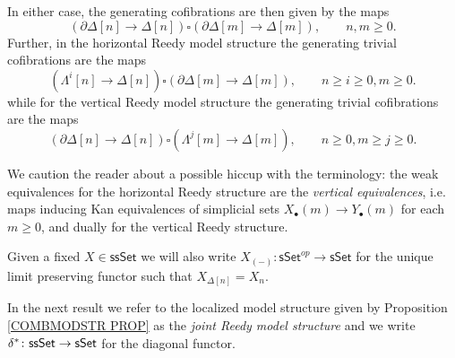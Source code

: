 \documentclass[a4paper,10pt
,draft
]{article}%
\begin{document}
In either case, the generating cofibrations are then given by the maps
\[
	\left( \partial \Delta[n] \to \Delta[n] \right)
\square
	\left( \partial \Delta[m] \to \Delta[m] \right),
	\qquad n,m\geq 0.
\]
Further, in the horizontal Reedy model structure the generating trivial cofibrations are the maps
\begin{equation}\label{GTRCOHOR EQ}
	\left( \Lambda^i[n] \to \Delta[n] \right)
\square
	\left( \partial \Delta[m] \to \Delta[m] \right),
\qquad n \geq i \geq 0,m\geq 0.
\end{equation}
while for the vertical Reedy model structure the generating trivial cofibrations are the maps
\begin{equation}\label{GTRCOVER EQ}
	\left( \partial \Delta[n] \to \Delta[n] \right)
\square
	\left( \Lambda^j[m] \to \Delta[m] \right),
\qquad n\geq 0,m\geq j \geq 0.
\end{equation}

We caution the reader about a possible hiccup with the terminology: 
the weak equivalences for the horizontal Reedy structure are the 
\textit{vertical equivalences},
i.e. maps inducing Kan equivalences of simplicial sets
$X_{\bullet}(m) \to Y_{\bullet}(m)$
for each $m \geq 0$, and dually for the vertical Reedy structure.

\begin{notation}\label{UNIQUELIM NOT}
	Given a fixed $X \in \mathsf{ssSet}$ we will also write
	$X_{(-)} \colon \mathsf{sSet}^{op} \to \mathsf{sSet}$
	for the unique limit preserving functor such that
	$X_{\Delta[n]} = X_n$.
\end{notation}



In the next result we refer to the localized model structure given by Proposition \ref{COMBMODSTR PROP} as the 
\textit{joint Reedy model structure} and
we write $\delta^{\**} \colon \mathsf{ssSet} \to \mathsf{sSet}$
for the diagonal functor.
\end{document}
